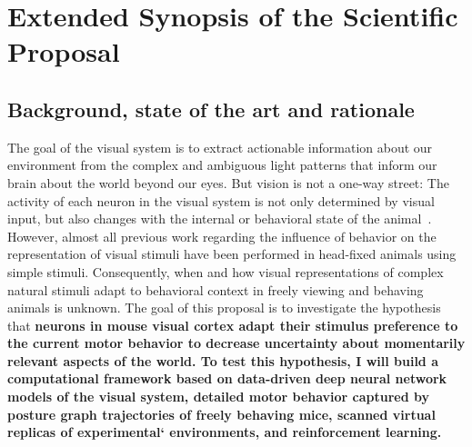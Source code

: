 \documentclass[COG,11pt]{ercgrant}
\begin{document}
\maketitle

\begin{mdframed}

\end{mdframed}


\section{Extended Synopsis of the Scientific Proposal}

\subsection{Background, state of the art and rationale}
The goal of the visual system is to extract actionable information about our environment from the complex and ambiguous light patterns that inform our brain about the world beyond our eyes.
But vision is not a one-way street: The activity of each neuron in the visual system is not only determined by visual input, but also changes with the internal or behavioral state of the animal~\parencite{Niell2010-bs, Erisken2014-un, Reimer2014-cf, Busse2017-rt, Musall2019-kd, Franke2022-do}. 
However, almost all previous work regarding the influence of behavior on the representation of visual stimuli have been performed in head-fixed animals using simple stimuli.
Consequently, when and how visual representations of complex natural stimuli adapt to behavioral context in freely viewing and behaving animals is unknown. 
The goal of this proposal is to investigate the hypothesis that
\textbf{neurons in mouse visual cortex adapt their stimulus preference to the current  motor behavior to decrease uncertainty about momentarily relevant aspects of the world. To test this hypothesis, I will build a computational framework based on data-driven deep neural network models of the visual system, detailed motor behavior captured by posture graph trajectories of freely behaving mice, scanned virtual replicas of experimental` environments, and reinforcement learning.}
\end{document}
